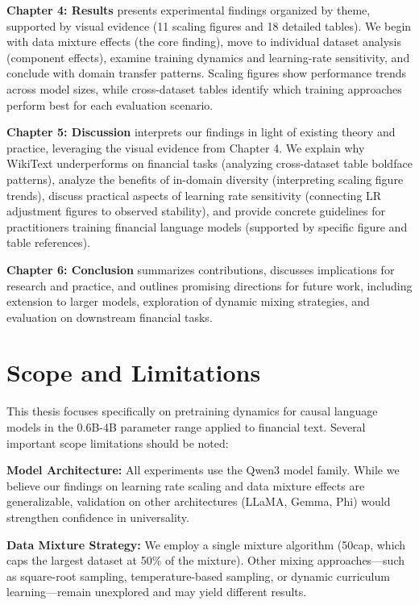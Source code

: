 \textbf{Chapter 4: Results} presents experimental findings organized by theme, supported by visual evidence (11 scaling figures and 18 detailed tables). We begin with data mixture effects (the core finding), move to individual dataset analysis (component effects), examine training dynamics and learning-rate sensitivity, and conclude with domain transfer patterns. Scaling figures show performance trends across model sizes, while cross-dataset tables identify which training approaches perform best for each evaluation scenario.

\textbf{Chapter 5: Discussion} interprets our findings in light of existing theory and practice, leveraging the visual evidence from Chapter 4. We explain why WikiText underperforms on financial tasks (analyzing cross-dataset table boldface patterns), analyze the benefits of in-domain diversity (interpreting scaling figure trends), discuss practical aspects of learning rate sensitivity (connecting LR adjustment figures to observed stability), and provide concrete guidelines for practitioners training financial language models (supported by specific figure and table references).

\textbf{Chapter 6: Conclusion} summarizes contributions, discusses implications for research and practice, and outlines promising directions for future work, including extension to larger models, exploration of dynamic mixing strategies, and evaluation on downstream financial tasks.

\section{Scope and Limitations}

This thesis focuses specifically on pretraining dynamics for causal language models in the 0.6B-4B parameter range applied to financial text. Several important scope limitations should be noted:

\textbf{Model Architecture:} All experiments use the Qwen3 model family. While we believe our findings on learning rate scaling and data mixture effects are generalizable, validation on other architectures (LLaMA, Gemma, Phi) would strengthen confidence in universality.

\textbf{Data Mixture Strategy:} We employ a single mixture algorithm (50cap, which caps the largest dataset at 50\% of the mixture). Other mixing approaches—such as square-root sampling, temperature-based sampling, or dynamic curriculum learning—remain unexplored and may yield different results.

